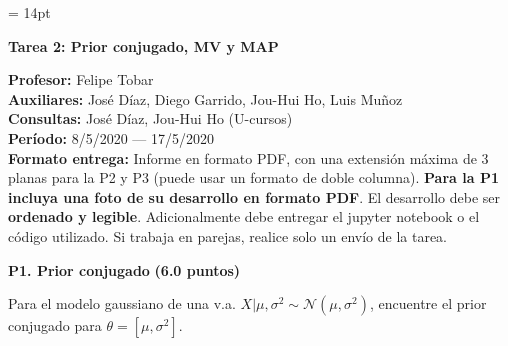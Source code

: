 \documentclass[11pt,letterpaper]{article}
\begin{document}
\pagestyle{fancy}
\fancyhf{}

\headheight = 14pt
\begin{center}
\large {\textbf{Tarea 2: Prior conjugado, MV y MAP}}\\
\end{center}
\textbf{Profesor:} Felipe Tobar\\ 
\textbf{Auxiliares:} José Díaz, Diego Garrido, Jou-Hui Ho, Luis Muñoz\\
\textbf{Consultas:} José Díaz, Jou-Hui Ho  (U-cursos)\\
\textbf{Período:} 8/5/2020 --- 17/5/2020 \\

\noindent\textbf{Formato entrega:} Informe en formato PDF, con una extensión máxima de 3 planas para la P2 y P3 (puede usar un formato de doble columna). \textbf{Para la P1 incluya una foto de su desarrollo en formato PDF}. El desarrollo debe ser \textbf{ordenado y legible}. Adicionalmente debe entregar el jupyter notebook o el código utilizado. Si trabaja en parejas, realice solo un envío de la tarea.

\vspace{5mm}



\vspace{5 mm}
\noindent\textbf{P1. Prior conjugado} \textbf{(6.0 puntos)}
\vspace{5 mm}

    Para el modelo gaussiano de una v.a. $X|\mu, \sigma^2 \sim \mathcal{N}(\mu, \sigma^2)$, encuentre el prior conjugado para $\theta = [\mu, \sigma^2]$.
    
    

\end{document}

